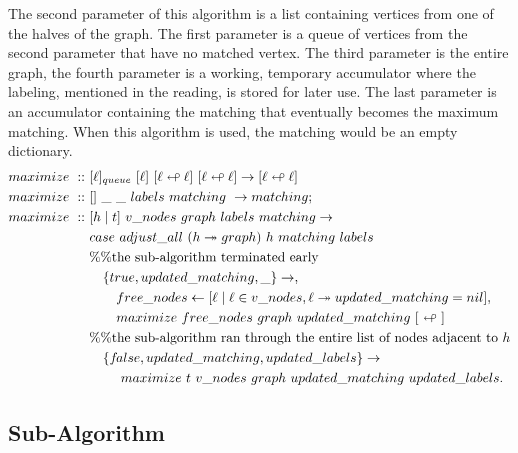 \documentclass[a4paper,10pt]{book}
\newcommand{\false}{f\kern-0.25ex{alse}}
\begin{document}
The second parameter of this algorithm is a list containing vertices from one of the halves of the graph. The first parameter is a queue of vertices from the second parameter that have no matched vertex. The third parameter is the entire graph, the fourth parameter is a working, temporary accumulator where the labeling, mentioned in the reading, is stored for later use. The last parameter is an accumulator containing the matching that eventually becomes the maximum matching. When this algorithm is used, the matching would be an empty dictionary.
\begin{align*}
maximize\ ::\ &[\ell]_{queue}\ [\ell]\ [\ell\looparrowleft\ell]\ [\ell\looparrowleft\ell]\rightarrow [\ell\looparrowleft\ell]\\
maximize\ ::\ &[]\ \_\ \_\ labels\ matching\ \rightarrow matching;\\
maximize\ ::\ &[h\mid t]\ v\_nodes\ graph\ labels\ matching\rightarrow\\
	&case\ adjust\_all\ (h\twoheadrightarrow graph)\ h\ matching\ labels\\
	&\%\%\text{the sub-algorithm terminated early}\\
	&\quad\{true,updated\_matching,\_\}\rightarrow,\\
	&\qquad free\_nodes\leftarrow [\ell\mid \ell\in v\_nodes,\ell\twoheadrightarrow updated\_matching = nil],\\
	& \qquad maximize\ free\_nodes\ graph\ updated\_matching\ [\ \looparrowleft\ ]\\
	&\%\%\text{the sub-algorithm ran through the entire list of nodes adjacent to } h\\
	&\quad\{\false,updated\_matching,updated\_labels\}\rightarrow\\
	&\qquad\ maximize\ t\ v\_nodes\ graph\ updated\_matching\ updated\_labels.
\end{align*}
\subsection{Sub-Algorithm}
\end{document}
